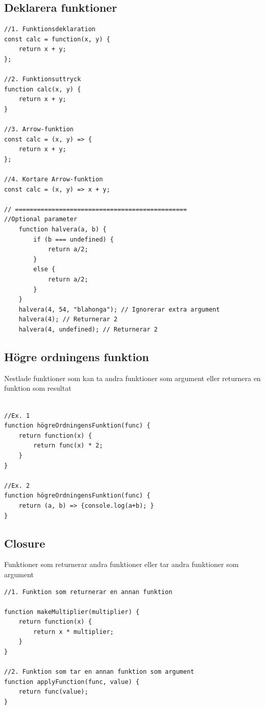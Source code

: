 \documentclass[12pt,a4paper]{article}
\begin{document}
\subsection{Deklarera funktioner}
\begin{verbatim}
//1. Funktionsdeklaration
const calc = function(x, y) {
    return x + y;
};

//2. Funktionsuttryck
function calc(x, y) {
    return x + y;
}

//3. Arrow-funktion
const calc = (x, y) => {
    return x + y;
};

//4. Kortare Arrow-funktion
const calc = (x, y) => x + y;

// ===============================================
//Optional parameter
    function halvera(a, b) {
        if (b === undefined) {
            return a/2;
        }
        else {
            return a/2;
        }
    }
    halvera(4, 54, "blahonga"); // Ignorerar extra argument
    halvera(4); // Returnerar 2
    halvera(4, undefined); // Returnerar 2
\end{verbatim}

\subsection{Högre ordningens funktion}
Nestlade funktioner som kan ta andra funktioner som argument eller returnera en funktion som resultat
\begin{verbatim}

//Ex. 1
function högreOrdningensFunktion(func) {
    return function(x) {
        return func(x) * 2;
    }
}

//Ex. 2
function högreOrdningensFunktion(func) {
    return (a, b) => {console.log(a+b); }
}
\end{verbatim}

\subsection{Closure}
Funktioner som returnerar andra funktioner eller tar andra funktioner som argument 
\begin{verbatim}
//1. Funktion som returnerar en annan funktion

function makeMultiplier(multiplier) {
    return function(x) {
        return x * multiplier;
    }
}

//2. Funktion som tar en annan funktion som argument
function applyFunction(func, value) {
    return func(value);
}
\end{verbatim}
\end{document}
